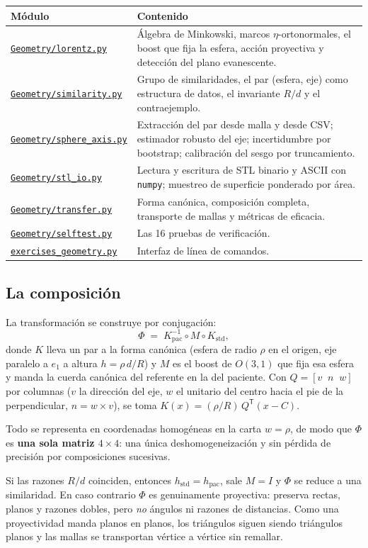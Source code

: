\documentclass[11pt,a4paper]{article}
\newcommand{\ghrepo}{https://github.com/gustavop-dev/humerous-detection-fat-supress}
\newcommand{\ghbranch}{geometry-exercises}
\newcommand{\ghblob}{\ghrepo/blob/\ghbranch}
\newcommand{\gh}[1]{\href{\ghblob/#1}{\texttt{#1}}}
\newcommand{\Rd}{\ensuremath{R/d}}
\newcommand{\Ot}{\ensuremath{O(3,1)}}
\begin{document}
\begin{longtable}{@{}p{4.2cm} p{11.4cm}@{}}
\toprule
\textbf{Módulo} & \textbf{Contenido} \\
\midrule
\endhead
\gh{Geometry/lorentz.py} & Álgebra de Minkowski, marcos $\eta$-ortonormales, el boost que
fija la esfera, acción proyectiva y detección del plano evanescente. \\
\gh{Geometry/similarity.py} & Grupo de similaridades, el par (esfera, eje) como estructura
de datos, el invariante \Rd{} y el contraejemplo. \\
\gh{Geometry/sphere\_axis.py} & Extracción del par desde malla y desde CSV; estimador
robusto del eje; incertidumbre por bootstrap; calibración del sesgo por truncamiento. \\
\gh{Geometry/stl\_io.py} & Lectura y escritura de STL binario y ASCII con
\texttt{numpy}; muestreo de superficie ponderado por área. \\
\gh{Geometry/transfer.py} & Forma canónica, composición completa, transporte de mallas y
métricas de eficacia. \\
\gh{Geometry/selftest.py} & Las 16 pruebas de verificación. \\
\gh{exercises\_geometry.py} & Interfaz de línea de comandos. \\
\bottomrule
\end{longtable}

\subsection{La composición}

La transformación se construye por conjugación:
\[
\Phi \;=\; K_{\text{pac}}^{-1} \circ M \circ K_{\text{std}},
\]
donde $K$ lleva un par a la forma canónica (esfera de radio $\rho$ en el origen, eje
paralelo a $e_1$ a altura $h = \rho\, d/R$) y $M$ es el boost de \Ot{} que fija esa esfera
y manda la cuerda canónica del referente en la del paciente. Con
$Q = [v\;\; n\;\; w]$ por columnas ($v$ la dirección del eje, $w$ el unitario del centro
hacia el pie de la perpendicular, $n = w \times v$), se toma $K(x) = (\rho/R)\,Q^{\mathsf T}(x - C)$.

Todo se representa en coordenadas homogéneas en la carta $w = \rho$, de modo que $\Phi$ es
\textbf{una sola matriz $4\times4$}: una única deshomogeneización y sin pérdida de precisión
por composiciones sucesivas.

Si las razones \Rd{} coinciden, entonces $h_{\text{std}} = h_{\text{pac}}$, sale $M = I$ y
$\Phi$ se reduce a una similaridad. En caso contrario $\Phi$ es genuinamente proyectiva:
preserva rectas, planos y razones dobles, pero \emph{no} ángulos ni razones de distancias.
Como una proyectividad manda planos en planos, los triángulos siguen siendo triángulos
planos y las mallas se transportan vértice a vértice sin remallar.
\end{document}
